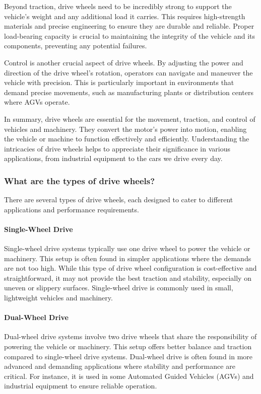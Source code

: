 \documentclass[../../main]{subfiles}
\begin{document}
Beyond traction, drive wheels need to be incredibly strong to support the vehicle's weight and any additional load it carries. This requires high-strength materials and precise engineering to ensure they are durable and reliable. Proper load-bearing capacity is crucial to maintaining the integrity of the vehicle and its components, preventing any potential failures.

Control is another crucial aspect of drive wheels. By adjusting the power and direction of the drive wheel's rotation, operators can navigate and maneuver the vehicle with precision. This is particularly important in environments that demand precise movements, such as manufacturing plants or distribution centers where AGVs operate.

In summary, drive wheels are essential for the movement, traction, and control of vehicles and machinery. They convert the motor's power into motion, enabling the vehicle or machine to function effectively and efficiently. Understanding the intricacies of drive wheels helps to appreciate their significance in various applications, from industrial equipment to the cars we drive every day.

\subsubsection{What are the types of  drive wheels?}
There are several types of drive wheels, each designed to cater to different applications and performance requirements.
\paragraph{Single-Wheel Drive}
Single-wheel drive systems typically use one drive wheel to power the vehicle or machinery. This setup is often found in simpler applications where the demands are not too high. While this type of drive wheel configuration is cost-effective and straightforward, it may not provide the best traction and stability, especially on uneven or slippery surfaces. Single-wheel drive is commonly used in small, lightweight vehicles and machinery.
\paragraph{Dual-Wheel Drive}
Dual-wheel drive systems involve two drive wheels that share the responsibility of powering the vehicle or machinery. This setup offers better balance and traction compared to single-wheel drive systems. Dual-wheel drive is often found in more advanced and demanding applications where stability and performance are critical. For instance, it is used in some Automated Guided Vehicles (AGVs) and industrial equipment to ensure reliable operation.
\end{document}
